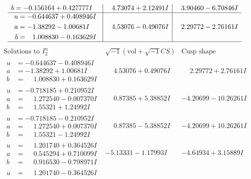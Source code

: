\documentclass[1p]{elsarticle_modified}
\theoremstyle{definition}
\newcommand{\I}{\sqrt{-1}}
\begin{document}
$$\begin{array}{c|c|c}
\begin{aligned}
b &= -0.156164 + 0.427777 I\end{aligned}
 & \phantom{-}4.73074 + 2.12491 I & \phantom{-}3.90460 - 6.70846 I \\ \hline\begin{aligned}
u &= -0.644637 + 0.408946 I \\
a &= -1.38292 - 1.00681 I \\
b &= \phantom{-}1.008830 - 0.163629 I\end{aligned}
 & \phantom{-}4.53076 - 0.49076 I & \phantom{-}2.29772 - 2.76161 I\\
 \hline 
 \end{array}$$\newpage$$\begin{array}{c|c|c}  
\text{Solutions to }I^u_{2}& \I (\text{vol} + \sqrt{-1}CS) & \text{Cusp shape}\\
 \hline 
\begin{aligned}
u &= -0.644637 - 0.408946 I \\
a &= -1.38292 + 1.00681 I \\
b &= \phantom{-}1.008830 + 0.163629 I\end{aligned}
 & \phantom{-}4.53076 + 0.49076 I & \phantom{-}2.29772 + 2.76161 I \\ \hline\begin{aligned}
u &= -0.718185 + 0.210952 I \\
a &= \phantom{-}1.272540 - 0.007370 I \\
b &= \phantom{-}1.55321 + 1.24992 I\end{aligned}
 & \phantom{-}0.87385 + 5.38852 I & -4.20699 - 10.26261 I \\ \hline\begin{aligned}
u &= -0.718185 - 0.210952 I \\
a &= \phantom{-}1.272540 + 0.007370 I \\
b &= \phantom{-}1.55321 - 1.24992 I\end{aligned}
 & \phantom{-}0.87385 - 5.38852 I & -4.20699 + 10.26261 I \\ \hline\begin{aligned}
u &= \phantom{-}1.201740 + 0.364526 I \\
a &= \phantom{-}0.545294 + 0.710099 I \\
b &= \phantom{-}0.916530 - 0.798971 I\end{aligned}
 & -5.13331 - 1.17993 I & -4.64934 + 3.15889 I \\ \hline\begin{aligned}
u &= \phantom{-}1.201740 - 0.364526 I \\

\end{aligned}
\end{array}$$
\end{document}
